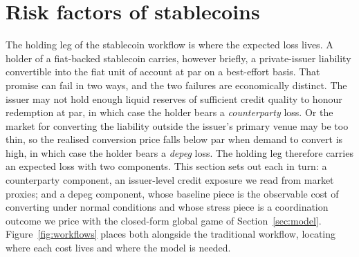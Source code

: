 \section{Risk factors of stablecoins}\label{sec:risk_factors}

The holding leg of the stablecoin workflow is where the expected loss lives. A holder of a fiat-backed stablecoin carries, however briefly, a private-issuer liability convertible into the fiat unit of account at par on a best-effort basis. That promise can fail in two ways, and the two failures are economically distinct. The issuer may not hold enough liquid reserves of sufficient credit quality to honour redemption at par, in which case the holder bears a \emph{counterparty} loss. Or the market for converting the liability outside the issuer's primary venue may be too thin, so the realised conversion price falls below par when demand to convert is high, in which case the holder bears a \emph{depeg} loss. The holding leg therefore carries an expected loss with two components. This section sets out each in turn: a counterparty component, an issuer-level credit exposure we read from market proxies; and a depeg component, whose baseline piece is the observable cost of converting under normal conditions and whose stress piece is a coordination outcome we price with the closed-form global game of Section~\ref{sec:model}. Figure~\ref{fig:workflows} places both alongside the traditional workflow, locating where each cost lives and where the model is needed.

